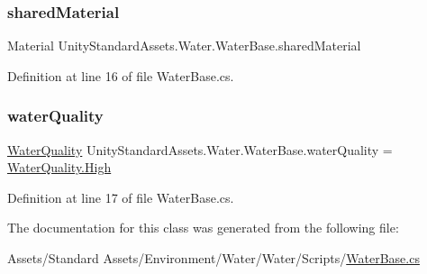 \mbox{\label{class_unity_standard_assets_1_1_water_1_1_water_base_a7aff509c9ae54c5a455fa2056111dc4d}} 
\subsubsection{\texorpdfstring{shared\+Material}{sharedMaterial}}
{\footnotesize\ttfamily Material Unity\+Standard\+Assets.\+Water.\+Water\+Base.\+shared\+Material}



Definition at line 16 of file Water\+Base.\+cs.

\mbox{\label{class_unity_standard_assets_1_1_water_1_1_water_base_a55893c3ad6b86eef9d154125f16abc08}} 
\subsubsection{\texorpdfstring{water\+Quality}{waterQuality}}
{\footnotesize\ttfamily \mbox{\hyperlink{namespace_unity_standard_assets_1_1_water_ac23a9da55bc8ba734d644ff4cc1f15f5}{Water\+Quality}} Unity\+Standard\+Assets.\+Water.\+Water\+Base.\+water\+Quality = \mbox{\hyperlink{namespace_unity_standard_assets_1_1_water_ac23a9da55bc8ba734d644ff4cc1f15f5a655d20c1ca69519ca647684edbb2db35}{Water\+Quality.\+High}}}



Definition at line 17 of file Water\+Base.\+cs.



The documentation for this class was generated from the following file\+:\begin{DoxyCompactItemize}
\item 
Assets/\+Standard Assets/\+Environment/\+Water/\+Water/\+Scripts/\mbox{\hyperlink{_water_base_8cs}{Water\+Base.\+cs}}\end{DoxyCompactItemize}
